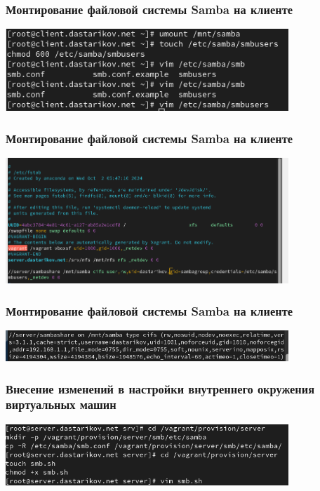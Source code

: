 \begin{frame}
\frametitle{Монтирование файловой системы Samba на клиенте}
    \includegraphics[width=0.8\textwidth]{../images/image22.png}
\end{frame}


\begin{frame}
\frametitle{Монтирование файловой системы Samba на клиенте}
    \includegraphics[width=0.8\textwidth]{../images/image23.png}
\end{frame}


\begin{frame}
\frametitle{Монтирование файловой системы Samba на клиенте}
    \includegraphics[width=0.8\textwidth]{../images/image24.png}
\end{frame}


\begin{frame}
\frametitle{Внесение изменений в настройки внутреннего окружения виртуальных машин}
    \includegraphics[width=0.8\textwidth]{../images/image25.png}
\end{frame}


